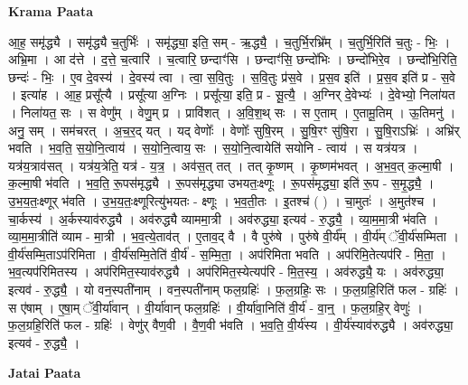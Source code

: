 \documentclass[17pt]{extarticle}
\begin{document}
\textbf{Krama Paata} \newline

आ॒ह॒ समृ॑द्ध्यै । समृ॑द्ध्यै च॒तुर्भिः॑ । समृ॑द्ध्या॒ इति॒ सम् - ऋ॒द्ध्यै॒ । च॒तुर्भि॒रभ्रि᳚म् । च॒तुर्भि॒रिति॑ च॒तुः - भिः॒ । अभ्रि॒मा । आ द॑त्ते । द॒त्ते॒ च॒त्वारि॑ । च॒त्वारि॒ छन्दाꣳ॑सि । छन्दाꣳ॑सि॒ छन्दो॑भिः । छन्दो॑भिरे॒व । छन्दो॑भि॒रिति॒ छन्दः॑ - भिः॒ । ए॒व दे॒वस्य॑ । दे॒वस्य॑ त्वा । त्वा॒ स॒वि॒तुः । स॒वि॒तुः प्र॑स॒वे । प्र॒स॒व इति॑ । प्र॒स॒व इति॑ प्र - स॒वे । इत्या॑ह । आ॒ह॒ प्रसू᳚त्यै । 
प्रसू᳚त्या अ॒ग्निः । प्रसू᳚त्या॒ इति॒ प्र - सू॒त्यै॒ । अ॒ग्निर् दे॒वेभ्यः॑ । दे॒वेभ्यो॒ निला॑यत । निला॑यत॒ सः । स वेणु᳚म् । वेणु॒म् प्र । प्रावि॑शत् । अ॒वि॒श॒थ् सः । स ए॒ताम् । ए॒तामू॒तिम् । ऊ॒तिमनु॑ । अनु॒ सम् । 
सम॑चरत् । अ॒च॒र॒द् यत् । यद् वेणोः᳚ । वेणोः᳚ सुषि॒रम् । सु॒षि॒रꣳ सु॑षि॒रा । सु॒षि॒राऽभ्रिः॑ । अभ्रि॑र् भवति । भ॒व॒ति॒ स॒यो॒नि॒त्वाय॑ । स॒यो॒नि॒त्वाय॒ सः । स॒यो॒नि॒त्वायेति॑ सयोनि - त्वाय॑ । स यत्र॑यत्र । यत्र॑य॒त्राव॑सत् । यत्र॑य॒त्रेति॒ यत्र॑ - य॒त्र॒ । अव॑स॒त् तत् । तत् कृ॒ष्णम् । कृ॒ष्णम॑भवत् । अ॒भ॒व॒त् क॒ल्मा॒षी । क॒ल्मा॒षी भ॑वति । भ॒व॒ति॒ रू॒पस॑मृद्ध्यै । रू॒पस॑मृद्ध्या उभयतः॒क्ष्णूः । रू॒पस॑मृद्ध्या॒ इति॑ रू॒प - स॒मृ॒द्ध्यै॒ । उ॒भ॒य॒तः॒क्ष्णूर् भ॑वति । उ॒भ॒य॒तः॒क्ष्णूरित्यु॑भयतः - क्ष्णूः । भ॒व॒ती॒तः । इ॒तश्च॑ ( ) । चा॒मुतः॑ । अ॒मुत॑श्च । चा॒र्कस्य॑ । अ॒र्कस्याव॑रुद्ध्यै । अव॑रुद्ध्यै व्याममा॒त्री । अव॑रुद्ध्या॒ इत्यव॑ - रु॒द्ध्यै॒ । व्या॒म॒मा॒त्री भ॑वति । व्या॒म॒मा॒त्रीति॑ व्याम - मा॒त्री । भ॒व॒त्ये॒ताव॑त् । ए॒ताव॒द् वै । वै पुरु॑षे । पुरु॑षे वी॒र्य᳚म् । वी॒र्य॑म् ॅवी॒र्य॑सम्मिता । वी॒र्य॑सम्मि॒ताऽप॑रिमिता । वी॒र्य॑सम्मि॒तेति॑ वी॒र्य॑ - स॒म्मि॒ता॒ । अप॑रिमिता भवति । अप॑रिमि॒तेत्यप॑रि - मि॒ता॒ । भ॒व॒त्यप॑रिमितस्य । अप॑रिमित॒स्याव॑रुद्ध्यै । अप॑रिमित॒स्येत्यप॑रि - मि॒त॒स्य॒ । अव॑रुद्ध्यै॒ यः । अव॑रुद्ध्या॒ इत्यव॑ - रु॒द्ध्यै॒ । यो वन॒स्पती॑नाम् । वन॒स्पती॑नाम् फल॒ग्रहिः॑ । फ॒ल॒ग्रहिः॒ सः । फ॒ल॒ग्रहि॒रिति॑ फल - ग्रहिः॑ । स ए॑षाम् । ए॒षा॒म् ॅवी॒र्या॑वान् । वी॒र्या॑वान् फल॒ग्रहिः॑ । वी॒र्या॑वा॒निति॑ वी॒र्य॑ - वा॒न्॒ । फ॒ल॒ग्रहि॒र् वेणुः॑ । फ॒ल॒ग्रहि॒रिति॑ फल - ग्रहिः॑ । वेणु॑र् वैण॒वी । वै॒ण॒वी भ॑वति । भ॒व॒ति॒ वी॒र्य॑स्य । वी॒र्य॑स्याव॑रुद्ध्यै । अव॑रुद्ध्या॒ इत्यव॑ - रु॒द्ध्यै॒ । \newline

\textbf{Jatai Paata} \newline
\end{document}

